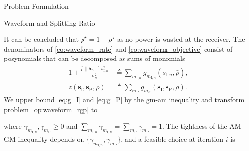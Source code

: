\begin{section}{Problem Formulation}
\begin{subsection}{Waveform and Splitting Ratio}
\begin{mini!}
			\label{co:waveform_objective}
			\label{co:waveform_rate}
			\label{co:waveform_power}
			\label{co:waveform_splitting_ratio}
		\end{mini!}
		It can be concluded that $\bar{\rho}^{\star}=1-\rho^{\star}$ as no power is wasted at the receiver. The denominators of \eqref{co:waveform_rate} and \eqref{co:waveform_objective} consist of posynomials \cite{Boyd2007} that can be decomposed as sums of monomials
		\begin{align}
			1+\frac{\bar{\rho}\lVert{\boldsymbol{h}_n}\rVert^2 s_{\mathrm{I},n}^2}{\sigma_n^2} &\triangleq \sum_{m_{\mathrm{I},n}}g_{m_{\mathrm{I},n}}(s_{\mathrm{I},n},\bar{\rho})\label{eq:g_I},\\
			z(\boldsymbol{s}_{\mathrm{I}},\boldsymbol{s}_\mathrm{P},\rho) &\triangleq \sum_{m_\mathrm{P}}{g_{m_\mathrm{P}}(\boldsymbol{s}_{\mathrm{I}},\boldsymbol{s}_\mathrm{P},\rho)}\label{eq:g_P}.
		\end{align}
		We upper bound \eqref{eq:g_I} and \eqref{eq:g_P} by the \gls{gm}-\gls{am} inequality \cite{Chiang2005} and transform problem~\eqref{op:waveform_rgp} to
		\begin{mini!}
			{}{}{\label{op:waveform_gp}}{}
		\end{mini!}
		where $\gamma_{m_{\mathrm{I},n}},\gamma_{m_\mathrm{P}} \ge 0$ and $\sum_{m_{\mathrm{I},n}}\gamma_{m_{\mathrm{I},n}}=\sum_{m_\mathrm{P}}\gamma_{m_\mathrm{P}}=1$. The tightness of the AM-GM inequality depends on $\{\gamma_{m_{\mathrm{I},n}},\gamma_{m_\mathrm{P}}\}$, and a feasible choice at iteration $i$ is

\end{subsection}
\end{section}
